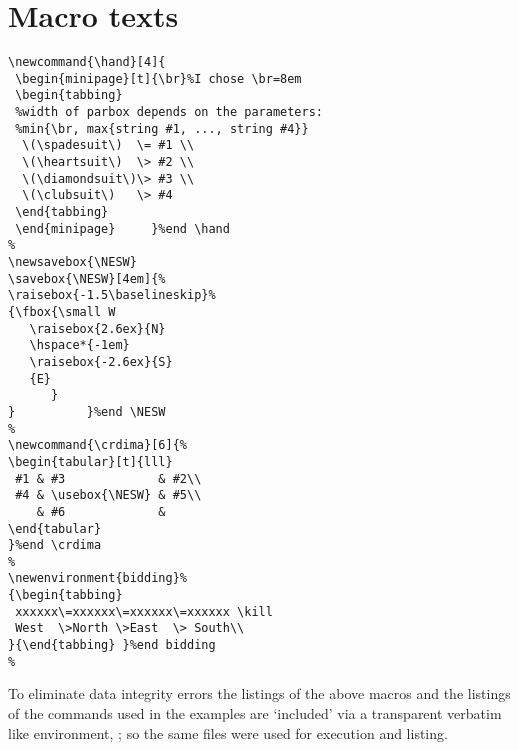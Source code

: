 \section{Macro texts}
%
%
\begin{verbatim}
\newcommand{\hand}[4]{
 \begin{minipage}[t]{\br}%I chose \br=8em
 \begin{tabbing}
 %width of parbox depends on the parameters:
 %min{\br, max{string #1, ..., string #4}}
  \(\spadesuit\)  \= #1 \\
  \(\heartsuit\)  \> #2 \\
  \(\diamondsuit\)\> #3 \\
  \(\clubsuit\)   \> #4
 \end{tabbing}
 \end{minipage}     }%end \hand
%
\newsavebox{\NESW}
\savebox{\NESW}[4em]{%
\raisebox{-1.5\baselineskip}%
{\fbox{\small W
   \raisebox{2.6ex}{N}
   \hspace*{-1em}
   \raisebox{-2.6ex}{S}
   {E}
      }
}          }%end \NESW
%
\newcommand{\crdima}[6]{%
\begin{tabular}[t]{lll}
 #1 & #3             & #2\\
 #4 & \usebox{\NESW} & #5\\
    & #6             &
\end{tabular}
}%end \crdima
%
\newenvironment{bidding}%
{\begin{tabbing}
 xxxxxx\=xxxxxx\=xxxxxx\=xxxxxx \kill
 West  \>North \>East  \> South\\
}{\end{tabbing} }%end bidding
%
\end{verbatim}%
%
To eliminate data integrity errors
the listings of the above macros and
the listings of the commands used in the examples are `included'
via a transparent verbatim like environment, \cite{HM};
so the same files were used for execution and listing.
%
